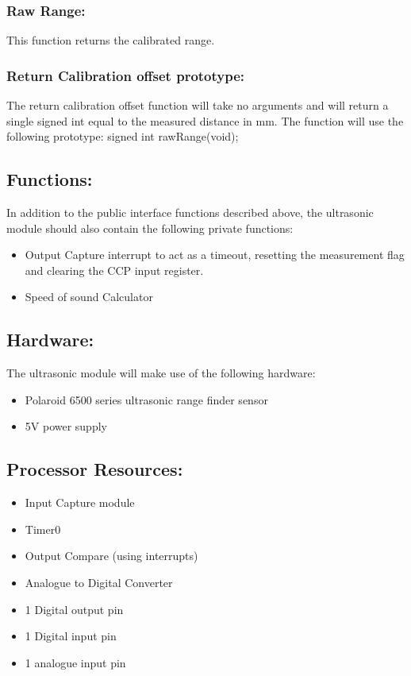 \documentclass[]{article}
\begin{document}
\subsubsection{Raw Range:}
This function returns the calibrated range.

\subsubsection{Return Calibration offset prototype:}
The return calibration offset function will take no arguments and will return a single signed int equal to the measured distance in mm. The function will use the following prototype: \newline \newline
signed int rawRange(void);

\subsection{Functions:}
In addition to the public interface functions described above, the ultrasonic module should also contain the following private functions:
\begin{itemize}
	\item Output Capture interrupt to act as a timeout, resetting the measurement flag and clearing the CCP input register.
	\item Speed of sound Calculator
\end{itemize}

\subsection{Hardware:}
The ultrasonic module will make use of the following hardware: 
\begin{itemize}
	\item Polaroid 6500 series ultrasonic range finder sensor
	\item 5V power supply
\end{itemize}

\subsection{Processor Resources:}
\begin{itemize}
	\item Input Capture module
	\item Timer0
	\item Output Compare (using interrupts)
	\item Analogue to Digital Converter
	\item 1 Digital output pin
	\item 1 Digital input pin
	\item 1 analogue input pin
\end{itemize}
\end{document}
